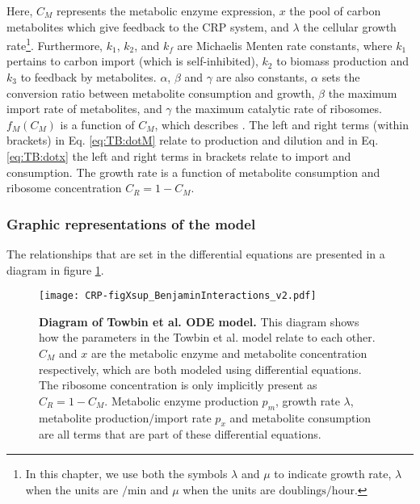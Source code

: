 Here, $C_M$ represents the metabolic enzyme expression, $x$ the pool of carbon metabolites which give feedback to the CRP system, and $\lambda$ the cellular growth rate\footnote{
    In this chapter, we use both the symbols $\lambda$ and $\mu$ to indicate growth rate,
    $\lambda$ when the units are $/\text{min}$ and
    $\mu$ when the units are $\text{doublings}/\text{hour}$.}.
%
Furthermore, $k_1$, $k_2$, and $k_f$ are Michaelis Menten rate constants, where $k_1$ pertains to carbon import (which is self-inhibited), $k_2$ to biomass production and $k_3$ to feedback by metabolites.
%
$\alpha$, $\beta$ and $\gamma$ are also constants, 
$\alpha$ sets the conversion ratio between metabolite consumption and growth,
$\beta$ the maximum import rate of metabolites,
and $\gamma$ the maximum catalytic rate of ribosomes.
%
$f_M(C_M)$ is a function of $C_M$, which describes . 
%
The left and right terms (within brackets) in Eq. \ref{eq:TB:dotM} relate to production and dilution and in Eq. \ref{eq:TB:dotx} the left and right terms in brackets relate to import and consumption.
%
The growth rate is a function of metabolite consumption and ribosome concentration $C_R=1-C_M$.

\subsubsection*{Graphic representations of the model}

The relationships that are set in the differential equations are presented in a diagram in figure \ref{fig:CRP:benjamin_ODEs_diagram}.
%

\begin{figure}
	\centering
	\texttt{[image: CRP-figXsup\_BenjaminInteractions\_v2.pdf]}
	\caption{ 
		\textbf{Diagram of Towbin et al. ODE model.}
		This diagram shows how the parameters in the Towbin et al. model relate to each other. $C_M$ and $x$ are the metabolic enzyme and metabolite concentration respectively, which are both modeled using differential equations. The ribosome concentration is only implicitly present as $C_R=1-C_M$. Metabolic enzyme production $p_m$, growth rate $\lambda$, metabolite production/import rate $p_x$ and metabolite consumption are all terms that are part of these differential equations.
	}
	\label{fig:CRP:benjamin_ODEs_diagram}
\end{figure}


